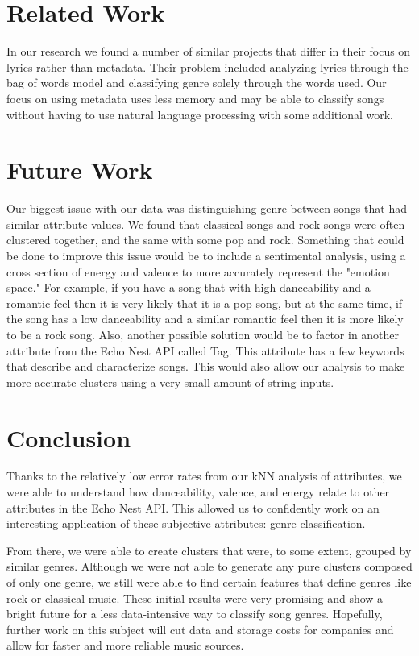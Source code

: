\documentclass{article}
\begin{document}
\section{Related Work}
In our research we found a number of similar projects that differ in their focus
on lyrics rather than metadata. Their problem included analyzing lyrics through
the bag of words model and classifying genre solely through the words used. Our
focus on using metadata uses less memory and may be able to classify songs
without having to use natural language processing with some additional work.

\section{Future Work}
Our biggest issue with our data was distinguishing genre between songs that had
similar attribute values. We found that classical songs and rock songs were
often clustered together, and the same with some pop and rock. Something that
could be done to improve this issue would be to include a sentimental analysis,
using a cross section of energy and valence to more accurately represent the
"emotion space." For example, if you have a song that with high danceability and
a romantic feel then it is very likely that it is a pop song, but at the same
time, if the song has a low danceability and a similar romantic feel then it is
more likely to be a rock song. Also, another possible solution would be to
factor in another attribute from the Echo Nest API called Tag. This attribute
has a few keywords that describe and characterize songs. This would also allow
our analysis to make more accurate clusters using a very small amount of string
inputs.

\section{Conclusion}
Thanks to the relatively low error rates from our kNN analysis of attributes, we
were able to understand how danceability, valence, and energy relate to other
attributes in the Echo Nest API. This allowed us to confidently work on an
interesting application of these subjective attributes: genre classification.

From there, we were able to create clusters that were, to some extent, grouped
by similar genres. Although we were not able to generate any pure clusters
composed of only one genre, we still were able to find certain features that
define genres like rock or classical music. These initial results were very
promising and show a bright future for a less data-intensive way to classify
song genres. Hopefully, further work on this subject will cut data and storage
costs for companies and allow for faster and more reliable music sources.
\end{document}
